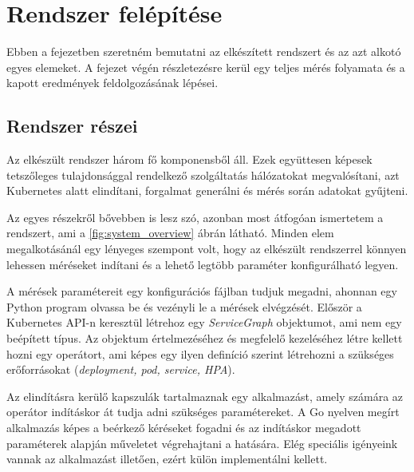 \chapter{Rendszer felépítése}
\label{sec:system}
Ebben a fejezetben szeretném bemutatni az elkészített rendszert és az azt alkotó egyes elemeket.
A fejezet végén részletezésre kerül egy teljes mérés folyamata és a kapott eredmények feldolgozásának lépései.

\section{Rendszer részei}
Az elkészült rendszer három fő komponensből áll. Ezek együttesen képesek tetszőleges tulajdonsággal rendelkező szolgáltatás hálózatokat megvalósítani, azt Kubernetes alatt elindítani, forgalmat generálni és mérés során adatokat gyűjteni. 

Az egyes részekről bővebben is lesz szó, azonban most átfogóan ismertetem a rendszert, ami a \ref{fig:system_overview} ábrán látható. Minden elem megalkotásánál egy lényeges szempont volt, hogy az elkészült rendszerrel könnyen lehessen méréseket indítani és a lehető legtöbb paraméter konfigurálható legyen.

A mérések paramétereit egy konfigurációs fájlban tudjuk megadni, ahonnan egy Python program olvassa be és vezényli le a mérések elvégzését.
Először a Kubernetes API-n keresztül létrehoz egy \textit{ServiceGraph} objektumot, ami nem egy beépített típus.
Az objektum értelmezéséhez és megfelelő kezeléséhez létre kellett hozni egy operátort, ami képes egy ilyen definíció szerint létrehozni a szükséges erőforrásokat (\textit{deployment, pod, service, HPA}).

Az elindításra kerülő kapszulák tartalmaznak egy alkalmazást, amely számára az operátor indításkor át tudja adni szükséges paramétereket. 
A Go nyelven megírt alkalmazás képes a beérkező kéréseket fogadni és az indításkor megadott paraméterek alapján műveletet végrehajtani a hatására.
Elég speciális igényeink vannak az alkalmazást illetően, ezért külön implementálni kellett.


